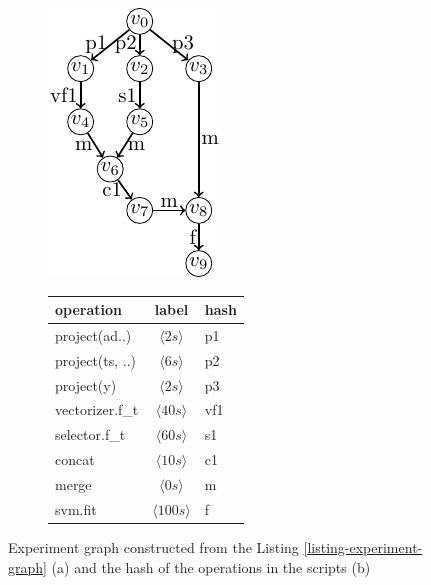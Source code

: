 \begin{figure}
\begin{subfigure}[b]{0.4\linewidth}
\centering
\includegraphics[width=0.8\linewidth]{../images/tikz-standalone/example-graph}
\caption{}
\end{subfigure}%
\begin{subfigure}[b]{0.6\linewidth}
\begin{tabular}{lcl}
\hline
operation & label &  hash \\
\hline
project(ad..) & $\langle 2s\rangle$ &p1 \\
project(ts, ..) & $\langle 6s\rangle$ & p2\\
project(y) & $\langle 2s\rangle$ & p3\\
vectorizer.f\_t & $\langle 40s\rangle$ & vf1 \\
selector.f\_t & $\langle 60s\rangle$ & s1 \\
concat & $\langle 10s\rangle$ & c1 \\
merge & $\langle 0s\rangle$ & m\\
svm.fit & $\langle 100s\rangle$ & f\\
\hline
\end{tabular}
\caption{}
\end{subfigure}
\caption{Experiment graph constructed from the Listing \ref{listing-experiment-graph} (a) and the hash of the operations in the scripts (b)}
\label{fig-experiment-graph}
\end{figure}

